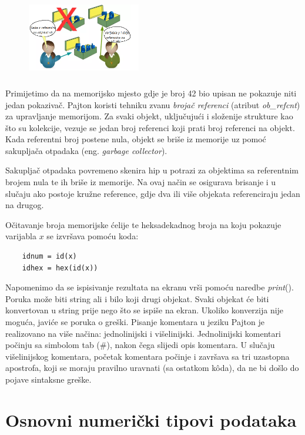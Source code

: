 \begin{figure}[H]
	\centering
	\includegraphics[width=140pt,height=100pt]{slike/varX_different_assigned.png}
\end{figure}

Primijetimo da na memorijsko mjesto gdje je broj 42 bio upisan ne pokazuje niti jedan pokazivač.  Pajton koristi tehniku zvanu \textit{brojač referenci} (atribut \textit{ob\_refcnt}) za upravljanje memorijom. Za svaki objekt, uključujući i složenije strukture kao što su kolekcije, vezuje se jedan broj referenci koji prati broj referenci na objekt. Kada referentni broj postene nula, objekt se briše iz memorije uz pomoć sakupljača otpadaka (eng. \textit{garbage collector}).

Sakupljač otpadaka   povremeno skenira hip u potrazi za objektima sa referentnim brojem nula te ih briše   iz memorije. Na ovaj način se osigurava brisanje i u slučaju  ako postoje kružne reference, gdje dva ili više objekata referenciraju jedan na drugog.

Očitavanje broja memorijske ćelije te heksadekadnog broja na koju pokazuje varijabla $x$ se izvršava pomoću koda:
\begin{verbatim}
	idnum = id(x) 
	idhex = hex(id(x)) 
\end{verbatim} 
 Napomenimo da se ispisivanje rezultata na ekranu vrši pomoću naredbe \emph{print}(). Poruka može biti string ali i bilo koji drugi objekat. Svaki objekat će biti konvertovan u string prije nego što se ispiše na ekran. Ukoliko konverzija nije moguća, javiće se poruka o greški. Pisanje komentara u jeziku Pajton je realizovano na više načina: jednolinijski i višelinijski. Jednolinijski komentari počinju sa simbolom tab (\#), nakon čega slijedi opis komentara. U slučaju višelinijskog komentara, početak komentara počinje i završava sa tri uzastopna apostrofa, koji se moraju pravilno uravnati (sa ostatkom k\^oda), da ne bi došlo do pojave sintaksne greške.  
 


\section{Osnovni numerički tipovi podataka}

